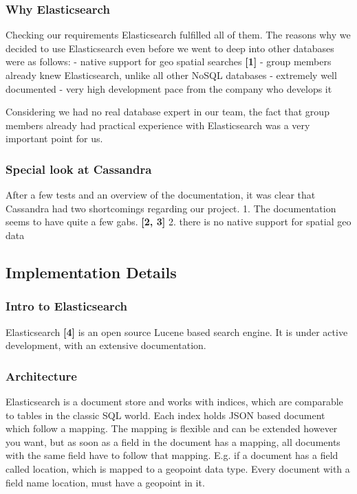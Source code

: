 \subsubsection{Why Elasticsearch}\label{why-elasticsearch}

Checking our requirements Elasticsearch fulfilled all of them. The
reasons why we decided to use Elasticsearch even before we went to deep
into other databases were as follows: - native support for geo spatial
searches \textbf{{[}1{]}} - group members already knew Elasticsearch,
unlike all other NoSQL databases - extremely well documented - very high
development pace from the company who develops it

Considering we had no real database expert in our team, the fact that
group members already had practical experience with Elasticsearch was a
very important point for us.

\subsubsection{Special look at
Cassandra}\label{special-look-at-cassandra}

After a few tests and an overview of the documentation, it was clear
that Cassandra had two shortcomings regarding our project. 1. The
documentation seems to have quite a few gabs. \textbf{{[}2, 3{]}} 2.
there is no native support for spatial geo data

\subsection{Implementation Details}\label{implementation-details}

\subsubsection{Intro to Elasticsearch}\label{intro-to-elasticsearch}

Elasticsearch \textbf{{[}4{]}} is an open source Lucene based search
engine. It is under active development, with an extensive documentation.

\subsubsection{Architecture}\label{architecture}

Elasticsearch is a document store and works with indices, which are
comparable to tables in the classic SQL world. Each index holds JSON
based document which follow a mapping. The mapping is flexible and can
be extended however you want, but as soon as a field in the document has
a mapping, all documents with the same field have to follow that
mapping. E.g. if a document has a field called location, which is mapped
to a geopoint data type. Every document with a field name location, must
have a geopoint in it.


